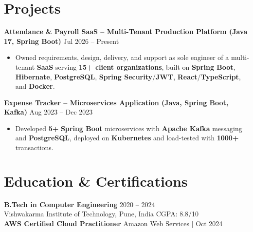 \documentclass[a4paper,10pt]{article}
\begin{document}
\section*{Projects}

\textbf{Attendance \& Payroll SaaS -- Multi-Tenant Production Platform (Java 17, Spring Boot)} \hfill Jul 2026 -- Present
\begin{itemize}[leftmargin=*]
    \item Owned requirements, design, delivery, and support as sole engineer of a multi-tenant \textbf{SaaS} serving \textbf{15+ client organizations}, built on \textbf{Spring Boot}, \textbf{Hibernate}, \textbf{PostgreSQL}, \textbf{Spring Security}/\textbf{JWT}, \textbf{React}/\textbf{TypeScript}, and \textbf{Docker}.
\end{itemize}

\textbf{Expense Tracker -- Microservices Application (Java, Spring Boot, Kafka)} \hfill Aug 2023 -- Dec 2023
\begin{itemize}[leftmargin=*]
    \item Developed \textbf{5+} \textbf{Spring Boot} microservices with \textbf{Apache Kafka} messaging and \textbf{PostgreSQL}, deployed on \textbf{Kubernetes} and load-tested with \textbf{1000+} transactions.
\end{itemize}

\section*{Education \& Certifications}
\textbf{B.Tech in Computer Engineering} \hfill 2020 -- 2024 \\
Vishwakarma Institute of Technology, Pune, India \hfill CGPA: 8.8/10 \\
\textbf{AWS Certified Cloud Practitioner} \hfill Amazon Web Services \;|\; Oct 2024
\end{document}
